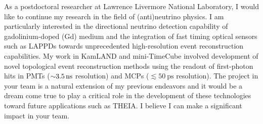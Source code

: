 \documentclass[10pt]{article} %
\begin{document}
%

As a postdoctoral researcher at Lawrence Livermore National Laboratory, I would
like to continue my research in the field of (anti)neutrino physics. I am
particularly interested in the directional neutrino detection capability of
gadolinium-doped (Gd) medium and the integration of fast timing optical sensors
such as LAPPDs towards unprecedented high-resolution event reconstruction
capabilities. My work in KamLAND and mini-TimeCube involved development of
novel topological event reconstruction methods using the readout of
first-photon hits in PMTs ($\SI{\sim 3.5}{\nano\second}$ resolution) and MCPs
($\lesssim \SI{50}{\pico\second}$ resolution). The project in your team is a
natural extension of my previous endeavors and it would be a dream come true to
play a critical role in the development of these technologies toward future
applications such as THEIA. I believe I can make a significant impact in your
team.
\end{document}
